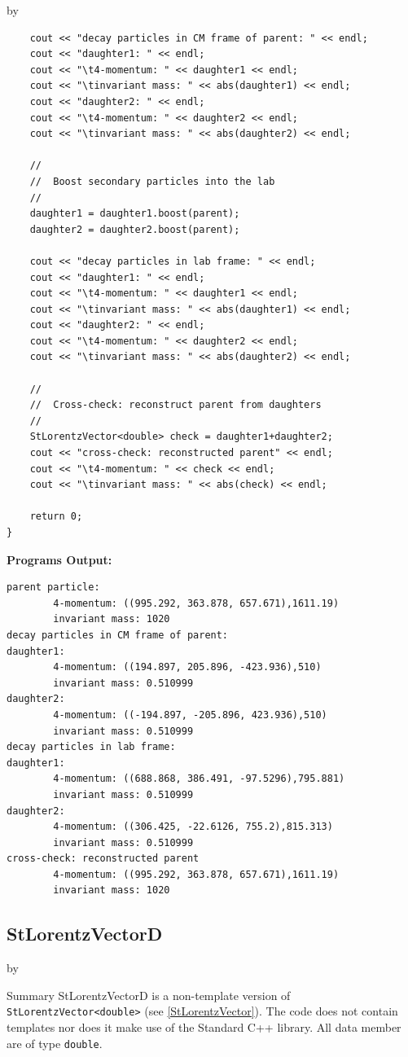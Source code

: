 \documentclass[twoside]{article}
\newcommand{\entrylabel}[1]{\mbox{\textbf{{#1}}}\hfil}%
\newenvironment{entry}
{\begin{list}{}%
    {\renewcommand{\makelabel}{\entrylabel}%
     \setlength{\labelwidth}{90pt}%
     \setlength{\leftmargin}{\labelwidth}
     \advance\leftmargin by \labelsep%
      }%
    }%
  {\end{list}}
\newcommand{\Entrylabel}[1]%
{\raisebox{0pt}[1ex][0pt]{\makebox[\labelwidth][l]%
    {\parbox[t]{\labelwidth}{\hspace{0pt}\textbf{{#1}}}}}}
\newenvironment{Entry}%
{\renewcommand{\entrylabel}{\Entrylabel}\begin{entry}}%
  {\end{entry}}
\begin{document}
\begin{description}
\begin{Entry}
{\begin{verbatim}
    cout << "decay particles in CM frame of parent: " << endl;
    cout << "daughter1: " << endl;
    cout << "\t4-momentum: " << daughter1 << endl;
    cout << "\tinvariant mass: " << abs(daughter1) << endl;
    cout << "daughter2: " << endl;
    cout << "\t4-momentum: " << daughter2 << endl;
    cout << "\tinvariant mass: " << abs(daughter2) << endl;
    
    //
    //  Boost secondary particles into the lab
    //
    daughter1 = daughter1.boost(parent);
    daughter2 = daughter2.boost(parent);
    
    cout << "decay particles in lab frame: " << endl;
    cout << "daughter1: " << endl;
    cout << "\t4-momentum: " << daughter1 << endl;
    cout << "\tinvariant mass: " << abs(daughter1) << endl;
    cout << "daughter2: " << endl;
    cout << "\t4-momentum: " << daughter2 << endl;
    cout << "\tinvariant mass: " << abs(daughter2) << endl;

    //
    //  Cross-check: reconstruct parent from daughters
    //
    StLorentzVector<double> check = daughter1+daughter2;
    cout << "cross-check: reconstructed parent" << endl;
    cout << "\t4-momentum: " << check << endl;
    cout << "\tinvariant mass: " << abs(check) << endl;
        
    return 0;
}
\end{verbatim}
}%
{\bf Programs Output:}
{\footnotesize
\begin{verbatim}
parent particle: 
        4-momentum: ((995.292, 363.878, 657.671),1611.19)
        invariant mass: 1020
decay particles in CM frame of parent: 
daughter1: 
        4-momentum: ((194.897, 205.896, -423.936),510)
        invariant mass: 0.510999
daughter2: 
        4-momentum: ((-194.897, -205.896, 423.936),510)
        invariant mass: 0.510999
decay particles in lab frame: 
daughter1: 
        4-momentum: ((688.868, 386.491, -97.5296),795.881)
        invariant mass: 0.510999
daughter2: 
        4-momentum: ((306.425, -22.6126, 755.2),815.313)
        invariant mass: 0.510999
cross-check: reconstructed parent
        4-momentum: ((995.292, 363.878, 657.671),1611.19)
        invariant mass: 1020
\end{verbatim}
} %
\end{Entry}

\clearpage

%
%
\subsection{StLorentzVectorD } \label{StLorentzVectorD}
\begin{Entry}
\item[Summary]
    StLorentzVectorD is a non-template version of \verb+StLorentzVector<double>+
    (see \ref{StLorentzVector}). The code does not contain templates nor
    does it make use of the Standard C++ library. All data member are of
    type \texttt{double}.
    

\end{Entry}
\end{description}
\end{document}

